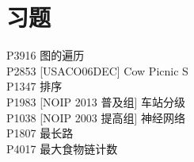 \documentclass{beamer}
\begin{document}
\section{习题}
\begin{frame}
P3916   图的遍历\\ 
P2853   [USACO06DEC] Cow Picnic S \\ 
P1347   排序 \\ 
P1983   [NOIP 2013 普及组] 车站分级 \\
P1038   [NOIP 2003 提高组] 神经网络 \\
P1807   最长路\\
P4017 最大食物链计数
\end{frame}
\end{document}
